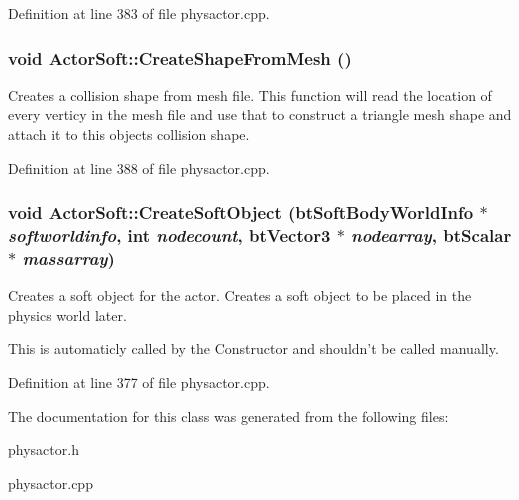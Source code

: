 Definition at line 383 of file physactor.cpp.\hypertarget{classActorSoft_a55ac461f317aed2b812f07eb384b2a6d}{
\subsubsection[{CreateShapeFromMesh}]{\setlength{\rightskip}{0pt plus 5cm}void ActorSoft::CreateShapeFromMesh ()}}
\label{d5/da4/classActorSoft_a55ac461f317aed2b812f07eb384b2a6d}


Creates a collision shape from mesh file. This function will read the location of every verticy in the mesh file and use that to construct a triangle mesh shape and attach it to this objects collision shape. 

Definition at line 388 of file physactor.cpp.\hypertarget{classActorSoft_a01a570c728d6cb96d1a40003d6b17e22}{
\subsubsection[{CreateSoftObject}]{\setlength{\rightskip}{0pt plus 5cm}void ActorSoft::CreateSoftObject (btSoftBodyWorldInfo $\ast$ {\em softworldinfo}, \/  int {\em nodecount}, \/  btVector3 $\ast$ {\em nodearray}, \/  btScalar $\ast$ {\em massarray})}}
\label{d5/da4/classActorSoft_a01a570c728d6cb96d1a40003d6b17e22}


Creates a soft object for the actor. Creates a soft object to be placed in the physics world later. \par
 This is automaticly called by the Constructor and shouldn't be called manually. 

Definition at line 377 of file physactor.cpp.

The documentation for this class was generated from the following files:\begin{DoxyCompactItemize}
\item 
physactor.h\item 
physactor.cpp\end{DoxyCompactItemize}
